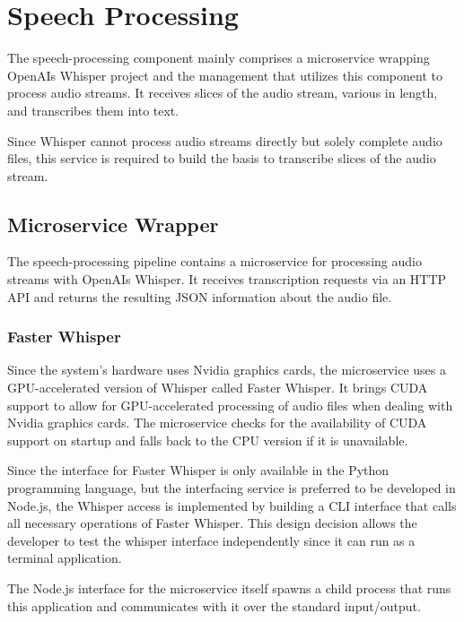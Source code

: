 \chapter{Speech Processing}

\label{SpeechProcessing}

The speech-processing component mainly comprises a microservice wrapping OpenAIs Whisper project and the management 
that utilizes this component to process audio streams. It receives slices of the audio stream, various in length, and
transcribes them into text.

Since Whisper cannot process audio streams directly but solely complete audio files, this service is required to build 
the basis to transcribe slices of the audio stream.


\section{Microservice Wrapper}

The speech-processing pipeline contains a microservice for processing audio streams with OpenAIs Whisper. It receives 
transcription requests via an HTTP API and returns the resulting JSON information about the audio file.

\subsection{Faster Whisper}

Since the system's hardware uses Nvidia graphics cards, the microservice uses a GPU-accelerated version of Whisper 
called Faster Whisper. It brings CUDA support to allow for GPU-accelerated processing of audio files when dealing with 
Nvidia graphics cards. The microservice checks for the availability of CUDA support on startup and falls back to the 
CPU version if it is unavailable.

Since the interface for Faster Whisper is only available in the Python programming language, but the interfacing 
service is preferred to be developed in Node.js, the Whisper access is implemented by building a CLI interface that 
calls all necessary operations of Faster Whisper. This design decision allows the developer to test the whisper 
interface independently since it can run as a terminal application.

The Node.js interface for the microservice itself spawns a child process that runs this application and communicates 
with it over the standard input/output.

